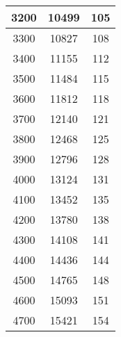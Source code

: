 \begin{table}[!ht]
\begin{tabular}{|c|c|c|}
      3200 & 10499 & 105 \\ \hline
      3300 & 10827 & 108 \\ \hline
      3400 & 11155 & 112 \\ \hline
      3500 & 11484 & 115 \\ \hline
      3600 & 11812 & 118 \\ \hline
      3700 & 12140 & 121 \\ \hline
      3800 & 12468 & 125 \\ \hline
      3900 & 12796 & 128 \\ \hline
      4000 & 13124 & 131 \\ \hline
      4100 & 13452 & 135 \\ \hline
      4200 & 13780 & 138 \\ \hline
      4300 & 14108 & 141 \\ \hline
      4400 & 14436 & 144 \\ \hline
      4500 & 14765 & 148 \\ \hline
      4600 & 15093 & 151 \\ \hline
      4700 & 15421 & 154 \\ \hline
  \end{tabular}
\end{table}

